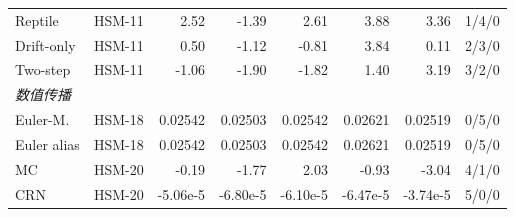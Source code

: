 \begin{longtable}{@{}p{.22\linewidth}p{.07\linewidth}rrrrrr@{}}
Reptile & HSM-11 & 2.52 & -1.39 & 2.61 & 3.88 & 3.36 & 1/4/0\\
Drift-only & HSM-11 & 0.50 & -1.12 & -0.81 & 3.84 & 0.11 & 2/3/0\\
Two-step & HSM-11 & -1.06 & -1.90 & -1.82 & 1.40 & 3.19 & 3/2/0\\
\multicolumn{8}{l}{\textit{数值传播}}\\
Euler-M. & HSM-18 & 0.02542 & 0.02503 & 0.02542 & 0.02621 & 0.02519 & 0/5/0\\
Euler alias & HSM-18 & 0.02542 & 0.02503 & 0.02542 & 0.02621 & 0.02519 & 0/5/0\\
MC & HSM-20 & -0.19 & -1.77 & 2.03 & -0.93 & -3.04 & 4/1/0\\
CRN & HSM-20 & -5.06e-5 & -6.80e-5 & -6.10e-5 & -6.47e-5 & -3.74e-5 & 5/0/0\\
\end{longtable}
\endgroup
